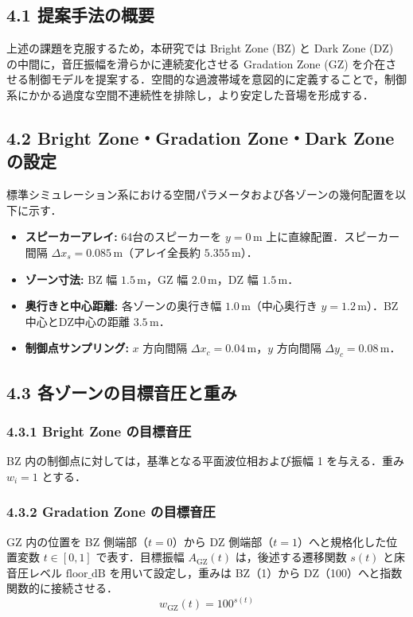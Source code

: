 \documentclass[11pt, a4paper]{article}
\begin{document}
\subsection{4.1 提案手法の概要}
上述の課題を克服するため，本研究では Bright Zone (BZ) と Dark Zone (DZ) の中間に，音圧振幅を滑らかに連続変化させる Gradation Zone (GZ) を介在させる制御モデルを提案する．空間的な過渡帯域を意図的に定義することで，制御系にかかる過度な空間不連続性を排除し，より安定した音場を形成する．

\subsection{4.2 Bright Zone・Gradation Zone・Dark Zone の設定}
標準シミュレーション系における空間パラメータおよび各ゾーンの幾何配置を以下に示す．
\begin{itemize}
    \item \textbf{スピーカーアレイ:} 64台のスピーカーを $y = 0\,\mathrm{m}$ 上に直線配置．スピーカー間隔 $\Delta x_s = 0.085\,\mathrm{m}$（アレイ全長約 $5.355\,\mathrm{m}$）．
    \item \textbf{ゾーン寸法:} BZ 幅 $1.5\,\mathrm{m}$，GZ 幅 $2.0\,\mathrm{m}$，DZ 幅 $1.5\,\mathrm{m}$．
    \item \textbf{奥行きと中心距離:} 各ゾーンの奥行き幅 $1.0\,\mathrm{m}$（中心奥行き $y = 1.2\,\mathrm{m}$）．BZ中心とDZ中心の距離 $3.5\,\mathrm{m}$．
    \item \textbf{制御点サンプリング:} $x$ 方向間隔 $\Delta x_c = 0.04\,\mathrm{m}$，$y$ 方向間隔 $\Delta y_c = 0.08\,\mathrm{m}$．
\end{itemize}

\subsection{4.3 各ゾーンの目標音圧と重み}
\subsubsection{4.3.1 Bright Zone の目標音圧}
BZ 内の制御点に対しては，基準となる平面波位相および振幅 1 を与える．重み $w_i = 1$ とする．

\subsubsection{4.3.2 Gradation Zone の目標音圧}
GZ 内の位置を BZ 側端部（$t=0$）から DZ 側端部（$t=1$）へと規格化した位置変数 $t \in [0, 1]$ で表す．目標振幅 $A_{\mathrm{GZ}}(t)$ は，後述する遷移関数 $s(t)$ と床音圧レベル $\mathrm{floor\_dB}$ を用いて設定し，重みは BZ（1）から DZ（100）へと指数関数的に接続させる．
\begin{equation}
w_{\mathrm{GZ}}(t) = 100^{s(t)}
\end{equation}
\end{document}
